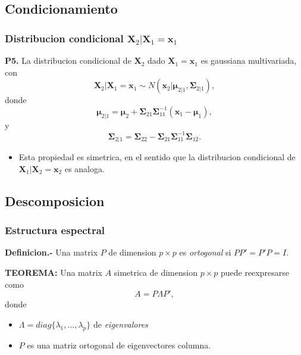 \documentclass[11pt,]{article}
\providecommand{\tightlist}{%
\setlength{\itemsep}{0pt}\setlength{\parskip}{0pt}}
\begin{document}
\subsection{Condicionamiento}\label{condicionamiento-1}

\subsubsection{\texorpdfstring{Distribucion condicional
\(\boldsymbol{X}_2|\boldsymbol{X}_1=\boldsymbol{x}_1\)}{Distribucion condicional \textbackslash{}boldsymbol\{X\}\_2\textbar{}\textbackslash{}boldsymbol\{X\}\_1=\textbackslash{}boldsymbol\{x\}\_1}}\label{distribucion-condicional-boldsymbolx_2boldsymbolx_1boldsymbolx_1}

\textbf{P5.} La distribucion condicional de \(\boldsymbol{X}_2\) dado
\(\boldsymbol{X}_1=\boldsymbol{x}_1\) es gaussiana multivariada, con \[
\boldsymbol{X}_2|\boldsymbol{X}_1=\boldsymbol{x}_1
\sim
N\left(\boldsymbol{x}_2|\boldsymbol{\mu}_{2|1},\boldsymbol{\Sigma}_{2|1}\right),
\] donde \[
\boldsymbol{\mu}_{2|1} = \boldsymbol{\mu}_2 + \boldsymbol{\Sigma}_{21}\boldsymbol{\Sigma}_{11}^{-1}(\boldsymbol{x}_1-\boldsymbol{\mu}_1),
\] y \[
\boldsymbol{\Sigma}_{2|1} = \boldsymbol{\Sigma}_{22} - \boldsymbol{\Sigma}_{21}\boldsymbol{\Sigma}_{11}^{-1}\boldsymbol{\Sigma}_{12}.
\]

\begin{itemize}
\tightlist
\item
  Esta propiedad es simetrica, en el sentido que la distribucion
  condicional de \(\boldsymbol{X}_1|\boldsymbol{X}_2=\boldsymbol{x}_2\)
  es analoga.
\end{itemize}

\subsection{Descomposicion}\label{descomposicion}

\subsubsection{Estructura espectral}\label{estructura-espectral}

\textbf{Definicion.-} Una matrix \(P\) de dimension \(p\times p\) es
\emph{ortogonal} si \(P P' = P' P=I\).

\textbf{TEOREMA:} Una matrix \(A\) simetrica de dimension \(p\times p\)
puede reexpresarse como \[A=P \Lambda P',\] donde

\begin{itemize}
\item
  \(\Lambda = diag\{\lambda_1,\ldots,\lambda_p\}\) de
  \emph{eigenvalores}
\item
  \(P\) es una matriz ortogonal de eigenvectores columna.
\end{itemize}
\end{document}
